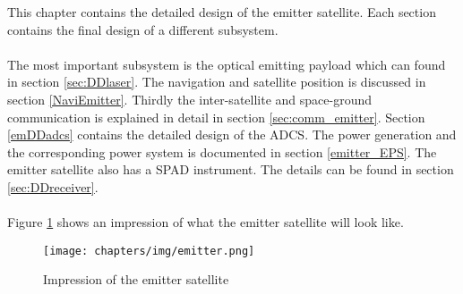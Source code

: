 This chapter contains the detailed design of the emitter satellite. Each section contains the final design of a different subsystem. 
\\\\
The most important subsystem is the optical emitting payload which can found in section \ref{sec:DDlaser}. The navigation and satellite position is discussed in section \ref{NaviEmitter}. Thirdly the inter-satellite and space-ground communication is explained in detail in section \ref{sec:comm_emitter}. Section \ref{emDDadcs} contains the detailed design of the \ac{ADCS}. The power generation and the corresponding power system is documented in section \ref{emitter_EPS}. The emitter satellite also has a \ac{SPAD} instrument. The details can be found in section \ref{sec:DDreceiver}.
\\\\
Figure \ref{fig:emitterSat} shows an impression of what the emitter satellite will look like.

\begin{figure}[h!]
\centering
\texttt{[image: chapters/img/emitter.png]}
\caption{Impression of the emitter satellite}
\label{fig:emitterSat}
\end{figure}